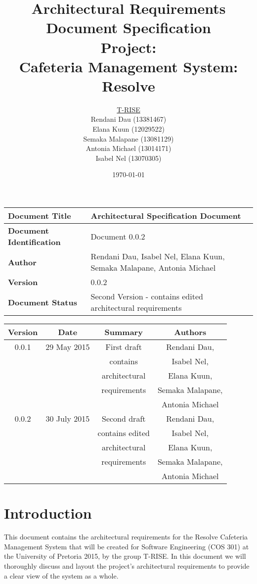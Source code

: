 \documentclass[a4paper,12pt]{article}
\title{\Huge Architectural Requirements Document Specification \\ 
	 Project: \\ 
	Cafeteria Management System: Resolve}
\author{
         \underline{T-RISE}\\
          Rendani Dau (13381467) \\
	Elana Kuun (12029522) \\
	Semaka Malapane (13081129) \\
	Antonia Michael (13014171) \\
	Isabel Nel (13070305)}
\date{\today}
\begin{document}
\maketitle
\break

\tableofcontents
\break

 \begin{tabu} to 0.8\textwidth { | X[l] | X[l] | }
 \hline
 \textbf{Document Title} & Architectural Specification Document \\
 \hline
 \textbf{Document Identification}  & Document 0.0.2 \\
 \hline
 \textbf{Author}  & Rendani Dau, Isabel Nel, Elana Kuun, Semaka Malapane, Antonia Michael \\
 \hline
 \textbf{Version} & 0.0.2\\
 \hline
 \textbf{Document Status} & Second Version - contains edited architectural requirements  \\
 \hline
 \end{tabu}

\begin{table}[h!]
\centering
 \begin{tabular}{||c c c c||} 
 \hline
 \textbf{Version} & \textbf{Date} & \textbf{Summary} & \textbf{Authors} \\ [0.5ex] 
 \hline\hline
 0.0.1 & 29 May 2015 & First draft & Rendani Dau, \\ & & contains & Isabel Nel, \\ & & architectural & Elana Kuun, \\ & & requirements & Semaka Malapane, \\ & & & Antonia Michael \\   [1ex] 
 \hline\hline
 0.0.2 & 30 July 2015 & Second draft & Rendani Dau, \\ & & contains edited & Isabel Nel, \\ & & architectural & Elana Kuun, \\ & & requirements & Semaka Malapane, \\ & & & Antonia Michael \\   [1ex] 
 \hline
 \end{tabular}
\end{table}

\pagebreak


\section{Introduction}
This document contains the architectural requirements for the Resolve Cafeteria Management System that will be created for Software Engineering (COS 301) at the University of Pretoria 2015, by the group T-RISE. In this document we will thoroughly discuss and layout the project's architectural requirements to provide a clear view of the system as a whole.  
\end{document}
